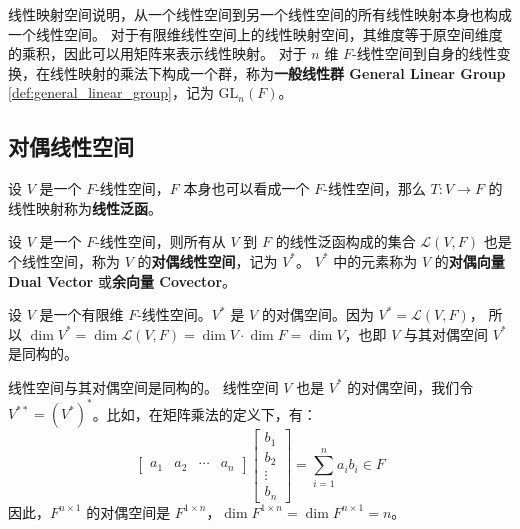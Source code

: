 \begin{note}
    线性映射空间说明，从一个线性空间到另一个线性空间的所有线性映射本身也构成一个线性空间。
    对于有限维线性空间上的线性映射空间，其维度等于原空间维度的乘积，因此可以用矩阵来表示线性映射。
    对于 $n$ 维 $F$-线性空间到自身的线性变换，在线性映射的乘法下构成一个群，称为\textbf{一般线性群 General Linear Group} \ref{def:general_linear_group}，记为 $\mathrm{GL}_n(F)$。
\end{note}

\vspace{1em}

\subsection{对偶线性空间}

\begin{definition}
    设 $V$ 是一个 $F$-线性空间，$F$ 本身也可以看成一个 $F$-线性空间，那么 $T:V\to F$ 的线性映射称为\textbf{线性泛函}。
    \label{def:linear_functional}
\end{definition}

\begin{definition}
    设 $V$ 是一个 $F$-线性空间，则所有从 $V$ 到 $F$ 的线性泛函构成的集合 $\mathcal{L}(V,F)$ 也是个线性空间，称为 $V$ 的\textbf{对偶线性空间}，记为 $V^*$。
    $V^*$ 中的元素称为 $V$ 的\textbf{对偶向量 Dual Vector} 或\textbf{余向量 Covector}。 
    \label{def:dual_linear_space}
\end{definition}

\begin{proposition}
    设 $V$ 是一个有限维 $F$-线性空间。$V^*$ 是 $V$ 的对偶空间。因为 $V^* = \mathcal{L}(V,F)$，
    所以 $\dim V^* = \dim \mathcal{L}(V,F) = \dim V \cdot \dim F = \dim V$，也即 $V$ 与其对偶空间 $V^*$ 是同构的。
\end{proposition}

\begin{note}
    线性空间与其对偶空间是同构的。
    线性空间 $V$ 也是 $V^*$ 的对偶空间，我们令 $V^{**} = (V^*)^*$。比如，在矩阵乘法的定义下，有：
    \[
        \begin{bmatrix}
            a_1 & a_2 & \cdots & a_n
        \end{bmatrix}\begin{bmatrix}
            b_1 \\ b_2 \\ \vdots \\ b_n
        \end{bmatrix} = \sum_{i=1}^{n} a_i b_i \in F
    \]
    因此，$F^{n\times 1}$ 的对偶空间是 $F^{1\times n}$，$\dim F^{1\times n} = \dim F^{n\times 1} = n$。
\end{note}

\newpage